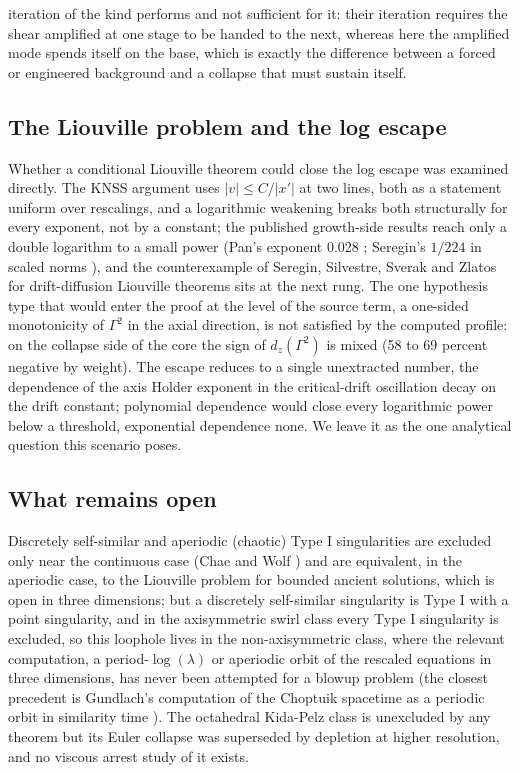 \documentclass[11pt]{article}
\begin{document}
iteration of the kind \cite{OAI26b} performs and not sufficient for it: their iteration requires the shear amplified at one stage to be handed to the next, whereas here the amplified mode spends itself on the base, which is exactly the difference between a forced or engineered background and a collapse that must sustain itself.

\subsection{The Liouville problem and the log escape}

Whether a conditional Liouville theorem could close the log escape was examined directly. The KNSS argument \cite{KNSS09} uses $|v| \le C / |x'|$ at two lines, both as a statement uniform over rescalings, and a logarithmic weakening breaks both structurally for every exponent, not by a constant; the published growth-side results reach only a double logarithm to a small power (Pan's exponent 0.028 \cite{P16}; Seregin's $1/224$ in scaled norms \cite{S21}), and the counterexample of Seregin, Silvestre, Sverak and Zlatos \cite{SSSZ12} for drift-diffusion Liouville theorems sits at the next rung. The one hypothesis type that would enter the proof at the level of the source term, a one-sided monotonicity of $\Gamma^2$ in the axial direction, is not satisfied by the computed profile: on the collapse side of the core the sign of $d_z(\Gamma^2)$ is mixed (58 to 69 percent negative by weight). The escape reduces to a single unextracted number, the dependence of the axis Holder exponent in the critical-drift oscillation decay on the drift constant; polynomial dependence would close every logarithmic power below a threshold, exponential dependence none. We leave it as the one analytical question this scenario poses.

\subsection{What remains open}

Discretely self-similar and aperiodic (chaotic) Type I singularities are excluded only near the continuous case (Chae and Wolf \cite{CW17a,CW17b}) and are equivalent, in the aperiodic case, to the Liouville problem for bounded ancient solutions, which is open in three dimensions; but a discretely self-similar singularity is Type I with a point singularity, and in the axisymmetric swirl class every Type I singularity is excluded, so this loophole lives in the non-axisymmetric class, where the relevant computation, a period-$\log(\lambda)$ or aperiodic orbit of the rescaled equations in three dimensions, has never been attempted for a blowup problem (the closest precedent is Gundlach's computation of the Choptuik spacetime as a periodic orbit in similarity time \cite{G95}). The octahedral Kida-Pelz class is unexcluded by any theorem but its Euler collapse was superseded by depletion at higher resolution, and no viscous arrest study of it exists.
\end{document}
